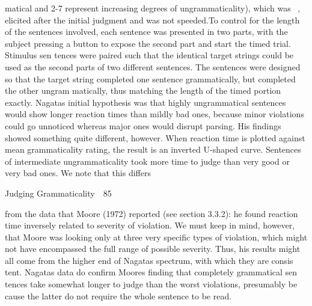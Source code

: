 \begin{styleStandard}
matical and 2-7 represent increasing degrees of ungrammaticality), which was \ , elicited after the initial judgment and was not speeded.To control for the length of the sentences involved, each sentence was presented in two parts, with the subject pressing a button to expose the second part and start the timed trial. Stimulus sen\- tences were paired such that the identical target strings could be used as the second parts of two different sentences. The sentences were designed so that the target string completed one sentence grammatically, but completed the other ungram\- matically, thus matching the length of the timed portion exactly. Nagata{\textquotesingle}s initial hypothesis was that highly ungrammatical sentences would show longer reaction times than mildly bad ones, because minor violations could go unnoticed whereas major ones would disrupt parsing. His findings showed something quite different, however. When reaction time is plotted against mean grammaticality rating, the result is an inverted U-shaped curve. Sentences of intermediate ungrammaticality took more time to judge than very good or very bad ones. We note that this differs
\end{styleStandard}


\clearpage\setcounter{page}{1}\begin{styleStandard}
Judging Grammaticality\ \ 85
\end{styleStandard}


\begin{styleTextbody}
from the data that Moore (1972) reported (see section 3.3.2): he found reaction time inversely related to severity of violation. We must keep in mind, however, that Moore was looking only at three very specific types of violation, which might not have encompassed the full range of possible severity. Thus, his results might all come from the higher end of Nagata{\textquotesingle}s spectrum, with which they are consis\- tent. Nagata{\textquotesingle}s data do confirm Moore{\textquotesingle}s finding that completely grammatical sen\- tences take somewhat longer to judge than the worst violations, presumably be\- cause the latter do not require the whole sentence to be read.
\end{styleTextbody}


